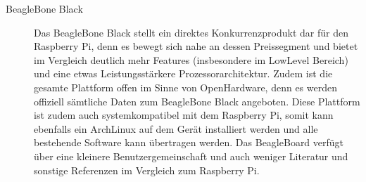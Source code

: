 \begin{description}
	\item[BeagleBone Black] Das BeagleBone Black stellt ein direktes
		Konkurrenzprodukt dar für den Raspberry Pi, denn es bewegt
		sich nahe an dessen Preissegment und bietet im Vergleich
		deutlich mehr Features (insbesondere im LowLevel Bereich)
		und eine etwas Leistungsstärkere Prozessorarchitektur. Zudem 
		ist die gesamte Plattform offen im Sinne von OpenHardware, 
		denn es werden offiziell sämtliche Daten zum BeagleBone Black
		angeboten. Diese Plattform ist zudem auch systemkompatibel
		mit dem Raspberry Pi, somit kann ebenfalls ein ArchLinux
		auf dem Gerät installiert werden und alle bestehende 
		Software kann übertragen werden. Das BeagleBoard verfügt
		über eine kleinere Benutzergemeinschaft und auch weniger
		Literatur und sonstige Referenzen im Vergleich zum Raspberry
		Pi.
\end{description}

